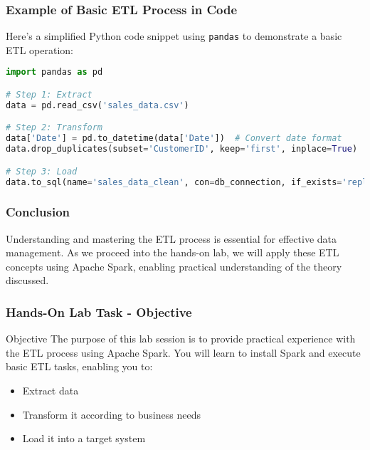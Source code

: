\documentclass[aspectratio=169]{beamer}
\begin{document}
\begin{frame}[fragile]
  \frametitle{Example of Basic ETL Process in Code}
  Here’s a simplified Python code snippet using \texttt{pandas} to demonstrate a basic ETL operation:
  
  \begin{lstlisting}[language=Python]
import pandas as pd

# Step 1: Extract
data = pd.read_csv('sales_data.csv')

# Step 2: Transform
data['Date'] = pd.to_datetime(data['Date'])  # Convert date format
data.drop_duplicates(subset='CustomerID', keep='first', inplace=True)  # Remove duplicates

# Step 3: Load
data.to_sql(name='sales_data_clean', con=db_connection, if_exists='replace')
  \end{lstlisting}
\end{frame}

\begin{frame}
  \frametitle{Conclusion}
  Understanding and mastering the ETL process is essential for effective data management. As we proceed into the hands-on lab, we will apply these ETL concepts using Apache Spark, enabling practical understanding of the theory discussed.
\end{frame}

\begin{frame}[fragile]
    \frametitle{Hands-On Lab Task - Objective}
    \begin{block}{Objective}
        The purpose of this lab session is to provide practical experience with the ETL process using Apache Spark. 
        You will learn to install Spark and execute basic ETL tasks, enabling you to:
        \begin{itemize}
            \item Extract data
            \item Transform it according to business needs
            \item Load it into a target system
        \end{itemize}
    \end{block}
\end{frame}
\end{document}
